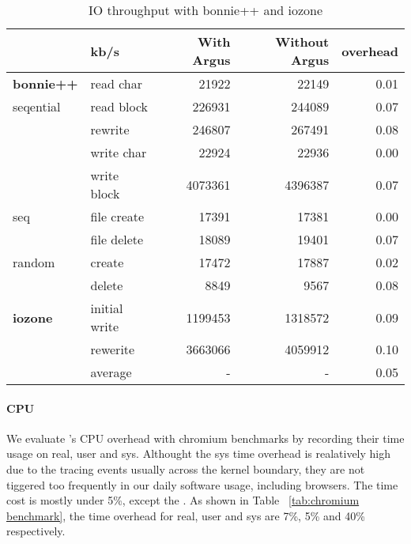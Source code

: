 \begin{table}[h]
\footnotesize
\centering
\begin{tabular}{ll|rrr}
\hline
 & kb/s & With Argus & Without Argus & overhead\\
 \hline
\textbf{bonnie++}&read char & 21922 & 22149 & 0.01\\
 seqential& read block & 226931 & 244089 & 0.07\\
 & rewrite & 246807 & 267491 & 0.08\\
 & write char & 22924 & 22936 & 0.00\\
 & write block & 4073361 & 4396387 & 0.07\\
 \hline
 seq& file create & 17391 & 17381 & 0.00\\
 & file delete & 18089 & 19401 & 0.07\\
 \hline
 random& create & 17472 & 17887 & 0.02\\
 & delete & 8849 & 9567 & 0.08\\
 \hline
 \hline
\textbf{iozone} & initial write & 1199453 & 1318572 & 0.09\\
 & rewerite & 3663066 & 4059912 & 0.10\\
 \hline
 & average & - & - & 0.05\\
 \hline
\end{tabular}
\caption{IO throughput with bonnie++ and iozone}
\label{tab:iothroughput}
\end{table}


\paragraph{CPU}

We evaluate \xxx's CPU overhead with chromium benchmarks by recording their time
usage on real, user and sys. Althought the sys time overhead is realatively
high due to the tracing events usually across the kernel boundary, they are not
tiggered too frequently in our daily software usage, including browsers. The
time cost is mostly under 5\%, except the . As
shown in Table ~\ref{tab:chromium benchmark}, the time overhead for real, user
and sys are 7\%, 5\% and 40\% respectively.

